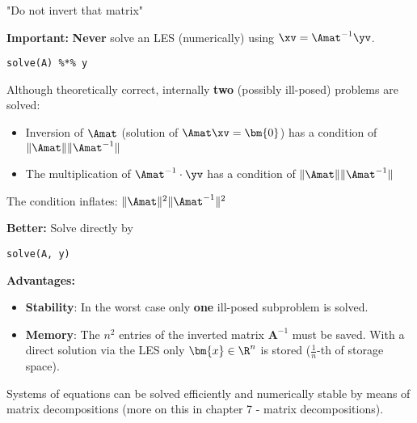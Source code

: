 \documentclass[11pt,compress,t,notes=noshow, xcolor=table]{beamer}
\begin{document}
\begin{vbframe}{"Do not invert that matrix"}

\textbf{Important:} \textbf{Never} solve an LES (numerically) using $\xv = \Amat^{-1} \yv$.
\lz
\footnotesize
\begin{verbatim}
solve(A) %*% y
\end{verbatim}

\lz

\normalsize
Although theoretically correct, internally \textbf{two} (possibly ill-posed) problems are solved:

\begin{itemize}
\item Inversion of $\Amat$ (solution of $\Amat \xv = \bm{0}$) has a condition of $\|\Amat\|\|\Amat^{-1}\|$
\item The multiplication of $\Amat^{-1} \cdot \yv$ has a condition of $\|\Amat\|\|\Amat^{-1}\|$
\end{itemize}

The condition inflates: $\|\Amat\|^2\|\Amat^{-1}\|^2$

\framebreak

\textbf{Better:} Solve directly by
\lz
\footnotesize
\begin{verbatim}
solve(A, y)
\end{verbatim}

\lz
\normalsize
\textbf{Advantages:}

\begin{itemize}
\item \textbf{Stability}: In the worst case only \textbf{one} ill-posed subproblem is solved.
\item \textbf{Memory}: The $n^2$ entries of the inverted matrix $\bm{A}^{-1}$ must be saved. With a direct solution via the LES only $\bm{x}\in \R^n$ is stored ($\frac{1}{n}$-th of storage space).
\end{itemize}

Systems of equations can be solved efficiently and numerically stable by means of matrix decompositions (more on this in chapter 7 - matrix decompositions).

\end{vbframe}


\end{document}
